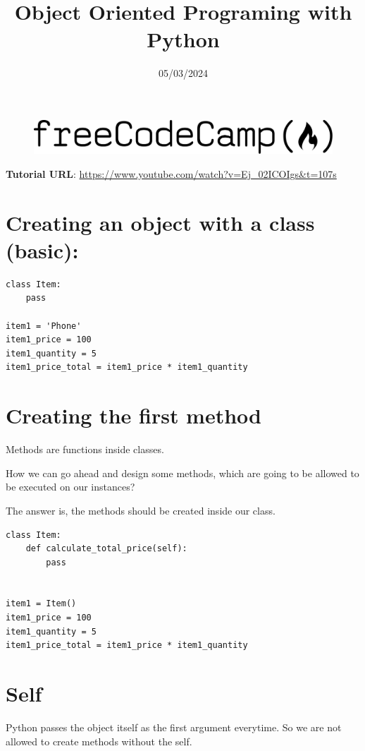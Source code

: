 \documentclass{article}
\begin{document}
\title{Object Oriented Programing with Python}
\date{05/03/2024}
\begin{figure}
	\centering
	\includegraphics[width=0.7\linewidth]{images/logo}

\end{figure}

\maketitle
\tableofcontents
\pagebreak

\textbf{Tutorial URL}:
\url{https://www.youtube.com/watch?v=Ej_02ICOIgs&t=107s}

\section{Creating an object with a class (basic):}
\begin{lstlisting}
class Item:
	pass

item1 = 'Phone'
item1_price = 100
item1_quantity = 5
item1_price_total = item1_price * item1_quantity
\end{lstlisting}

\section{Creating the first method}
Methods are functions inside classes.

How we can go ahead and design some methods, which are going to be allowed to be executed on our instances?

The answer is, the methods should be created inside our class.

\begin{lstlisting}
class Item:
	def calculate_total_price(self):
		pass
	
	
item1 = Item()
item1_price = 100
item1_quantity = 5
item1_price_total = item1_price * item1_quantity
\end{lstlisting}

\section{Self}
Python passes the object itself as the first argument everytime. So we are not allowed to create methods without the self. 
\end{document}
